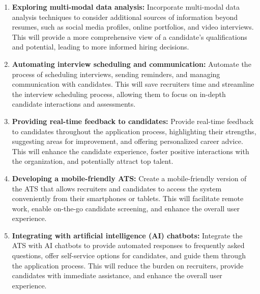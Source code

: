 \begin{enumerate}
    \item \textbf{Exploring multi-modal data analysis:} Incorporate multi-modal data analysis techniques to consider additional sources of information beyond resumes, such as social media profiles, online portfolios, and video interviews. This will provide a more comprehensive view of a candidate's qualifications and potential, leading to more informed hiring decisions.
    \item \textbf{Automating interview scheduling and communication:} Automate the process of scheduling interviews, sending reminders, and managing communication with candidates. This will save recruiters time and streamline the interview scheduling process, allowing them to focus on in-depth candidate interactions and assessments.
    \item \textbf{Providing real-time feedback to candidates:} Provide real-time feedback to candidates throughout the application process, highlighting their strengths, suggesting areas for improvement, and offering personalized career advice. This will enhance the candidate experience, foster positive interactions with the organization, and potentially attract top talent.
    \item \textbf{Developing a mobile-friendly ATS:} Create a mobile-friendly version of the ATS that allows recruiters and candidates to access the system conveniently from their smartphones or tablets. This will facilitate remote work, enable on-the-go candidate screening, and enhance the overall user experience.
    \item \textbf{Integrating with artificial intelligence (AI) chatbots:} Integrate the ATS with AI chatbots to provide automated responses to frequently asked questions, offer self-service options for candidates, and guide them through the application process. This will reduce the burden on recruiters, provide candidates with immediate assistance, and enhance the overall user experience.
\end{enumerate}

